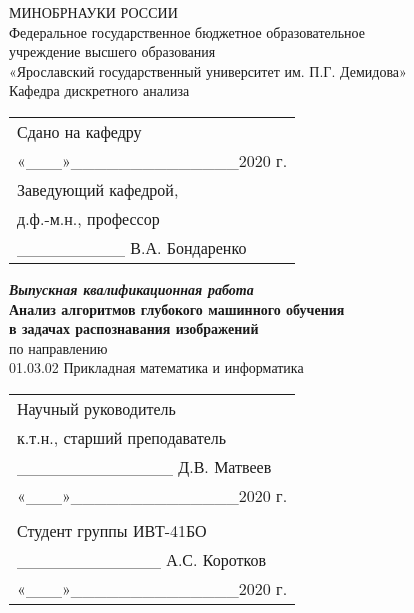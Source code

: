 \begin{titlepage}
  \begin{center}  
    МИНОБРНАУКИ   РОССИИ\\  
    Федеральное государственное бюджетное образовательное\\
    учреждение высшего образования\\  
    «Ярославский государственный университет им. П.Г. Демидова»\\  
    \vspace{1em}
    Кафедра дискретного анализа
  \end{center}
  \vspace{1em}
  \null\hfill\begin{tabular}{l@{}}
    Сдано на кафедру\\
    «\_\_\_»\_\_\_\_\_\_\_\_\_\_\_\_\_\_2020 г.\\
    Заведующий кафедрой,\\
    д.ф.-м.н., профессор\\
    \_\_\_\_\_\_\_\_\_ В.А. Бондаренко\\
  \end{tabular}
  \vspace{2em}
  \begin{center}
    \textbf{\textit{Выпускная квалификационная работа}}\\    
    \vspace{1em}
    \textbf{Анализ алгоритмов глубокого машинного обучения \\ в задачах распознавания изображений}\\
    \vspace{1em}
    по направлению \\ 01.03.02 Прикладная математика и информатика\\
  \end{center}
  \vspace{1em}
  \null\hfill\begin{tabular}{l@{}}
    Научный руководитель\\
    к.т.н., старший преподаватель\\
    \_\_\_\_\_\_\_\_\_\_\_\_\_ Д.В. Матвеев\\
    «\_\_\_»\_\_\_\_\_\_\_\_\_\_\_\_\_\_2020 г.\\
  \vspace{1em}\\
    Студент группы ИВТ-41БО\\
    \_\_\_\_\_\_\_\_\_\_\_\_ А.С. Коротков\\
    «\_\_\_»\_\_\_\_\_\_\_\_\_\_\_\_\_\_2020 г.\\
  \end{tabular}
  \vfill
\end{titlepage}
\clearpage